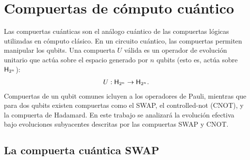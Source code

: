 \section{Compuertas de cómputo cuántico}

Las compuertas cuánticas son el análogo cuántico de las compuertas lógicas utilizadas en cómputo clásico. En un circuito cuántico, las compuertas permiten manipular los qubits. Una compuerta $U$ válida es un operador de evolución unitario que actúa sobre el espacio generado por $n$ qubits (esto es, actúa sobre ${\sf H}_{2^{n}}$):
\begin{equation*}
  U:{\sf H}_{2^{n}}\rightarrow{\sf H}_{2^{n}}.
\end{equation*}
Compuertas de un qubit comunes icluyen a los operadores de Pauli, mientras que para dos qubits existen compuertas como el SWAP, el controlled-not (CNOT), y la compuerta de Hadamard. En este trabajo se analizará la evolución efectiva bajo evoluciones subyacentes descritas por las compuertas SWAP y CNOT. 

\subsection{La compuerta cuántica SWAP}

